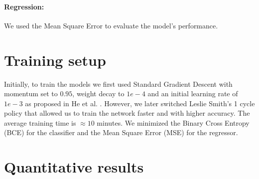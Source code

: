 \documentclass[../document.tex]{subfiles}
\begin{document}
\paragraph{Regression:} We used the Mean Square Error to evaluate the model's performance.

\section{Training setup}
Initially, to train the models we first used Standard Gradient Descent with momentum set to $0.95$, weight decay to $1e-4$ and an initial learning rate of $1e-3$ as proposed in He et al. \cite{he2015deep}. However, we later switched Leslie Smith's 1 cycle policy \cite{1cycle} that allowed us to train the network faster and with higher accuracy. The average training time is $\approx 10$ minutes. We minimized the Binary Cross Entropy (BCE) for the classifier and the  Mean Square Error (MSE) for the regressor.

\section{Quantitative results}
\end{document}
